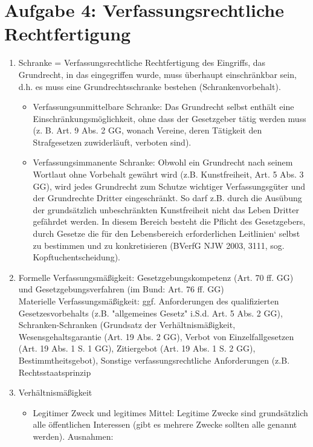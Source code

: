 \documentclass{article}
\begin{document}
	\section*{Aufgabe 4: Verfassungsrechtliche Rechtfertigung}
	\begin{enumerate}[label=(\alph*)]
		\item Schranke = Verfassungsrechtliche Rechtfertigung des Eingriffs, das Grundrecht, in das eingegriffen wurde, muss überhaupt einschränkbar sein, d.h. es muss eine Grundrechtsschranke bestehen (Schrankenvorbehalt). 
		\begin{itemize}
			\item Verfassungsunmittelbare Schranke: Das Grundrecht selbst enthält eine Einschränkungsmöglich\-keit, ohne dass der Gesetzgeber tätig werden muss (z. B. Art. 9 Abs. 2 GG, wonach Vereine, deren Tätigkeit den Strafgesetzen zuwiderläuft, verboten sind).
			\item Verfassungsimmanente Schranke: Obwohl ein Grundrecht nach seinem Wortlaut ohne Vorbehalt gewährt wird (z.B. Kunstfreiheit, Art. 5 Abs. 3 GG), wird jedes Grundrecht zum Schutze wichtiger Verfassungsgüter und der Grundrechte Dritter eingeschränkt. So darf z.B. durch die Ausübung der grundsätzlich unbeschränkten Kunstfreiheit nicht das Leben Dritter gefährdet werden. In diesem Bereich besteht die Pflicht des Gesetzgebers, durch Gesetze die für den Lebensbereich erforderlichen Leitlinien` selbst zu bestimmen und zu konkretisieren (BVerfG NJW 2003, 3111, sog. Kopftuchentscheidung).
		\end{itemize}
		\item Formelle Verfassungsmäßigkeit: Gesetzgebungskompetenz (Art. 70 ff. GG) und Gesetzgebungsverfahren (im Bund: Art. 76 ff. GG) \\
		Materielle Verfassungsmäßigkeit: ggf. Anforderungen des qualifizierten Gesetzesvorbehalts (z.B. "allgemeines Gesetz" i.S.d. Art. 5 Abs. 2 GG),  Schranken-Schranken (Grundsatz der Verhältnismäßigkeit, Wesensgehaltsgarantie (Art. 19 Abs. 2 GG), Verbot von Einzelfallgesetzen (Art. 19 Abs. 1 S. 1 GG), Zitiergebot (Art. 19 Abs. 1 S. 2 GG), Bestimmtheitsgebot),  Sonstige verfassungsrechtliche Anforderungen (z.B. Rechtsstaatsprinzip
		\item Verhältnismäßigkeit
		\begin{itemize}
			\item Legitimer Zweck und legitimes Mittel: Legitime Zwecke sind grundsätzlich alle öffentlichen Interessen (gibt es mehrere Zwecke sollten alle genannt werden). Ausnahmen:
			\begin{itemize}

\end{itemize}
\end{itemize}
\end{enumerate}
\end{document}
